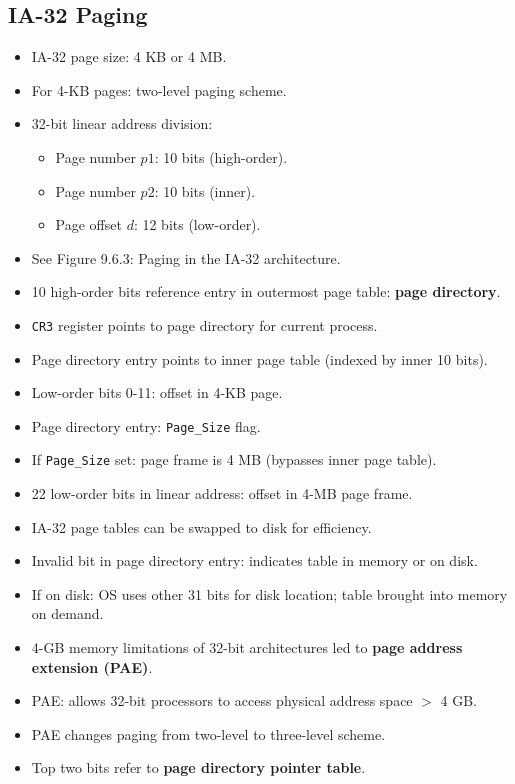 \subsection*{IA-32 Paging}
\begin{itemize}
    \item IA-32 page size: 4 KB or 4 MB.
    \item For 4-KB pages: two-level paging scheme.
    \item 32-bit linear address division:
    \begin{itemize}
        \item Page number $p1$: 10 bits (high-order).
        \item Page number $p2$: 10 bits (inner).
        \item Page offset $d$: 12 bits (low-order).
    \end{itemize}
    \item See Figure 9.6.3: Paging in the IA-32 architecture.
    \item 10 high-order bits reference entry in outermost page table: \textbf{page directory}.
    \item \texttt{CR3} register points to page directory for current process.
    \item Page directory entry points to inner page table (indexed by inner 10 bits).
    \item Low-order bits 0-11: offset in 4-KB page.
    \item Page directory entry: \texttt{Page\_Size} flag.
    \item If \texttt{Page\_Size} set: page frame is 4 MB (bypasses inner page table).
    \item 22 low-order bits in linear address: offset in 4-MB page frame.
    \item IA-32 page tables can be swapped to disk for efficiency.
    \item Invalid bit in page directory entry: indicates table in memory or on disk.
    \item If on disk: OS uses other 31 bits for disk location; table brought into memory on demand.
    \item 4-GB memory limitations of 32-bit architectures led to \textbf{page address extension (PAE)}.
    \item PAE: allows 32-bit processors to access physical address space $>$ 4 GB.
    \item PAE changes paging from two-level to three-level scheme.
    \item Top two bits refer to \textbf{page directory pointer table}.

\end{itemize}
